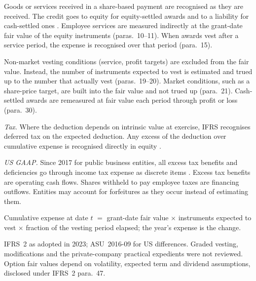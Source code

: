 \begin{qfmethod}\label{meth:share-based-compensation-reporting}
 Goods or services received in a share-based payment are recognised as they are received. The credit goes to equity for equity-settled awards and to a liability for cash-settled ones \citep[IFRS~2 para.~7]{eu-2023-1803-ifrs2}. Employee services are measured indirectly at the grant-date fair value of the equity instruments (paras.~10--11). When awards vest after a service period, the expense is recognised over that period (para.~15).

Non-market vesting conditions (service, profit targets) are excluded from the fair value. Instead, the number of instruments expected to vest is estimated and trued up to the number that actually vest (paras.~19--20). Market conditions, such as a share-price target, are built into the fair value and not trued up (para.~21). Cash-settled awards are remeasured at fair value each period through profit or loss (para.~30).

\emph{Tax.} Where the deduction depends on intrinsic value at exercise, IFRS recognises deferred tax on the expected deduction. Any excess of the deduction over cumulative expense is recognised directly in equity \citep[IAS~12 paras.~68A--68C]{eu-2023-1803-ias12}.

\emph{US GAAP.} Since 2017 for public business entities, all excess tax benefits and deficiencies go through income tax expense as discrete items \citep[pp.~1--3]{us-share-payment-2016}. Excess tax benefits are operating cash flows. Shares withheld to pay employee taxes are financing outflows. Entities may account for forfeitures as they occur instead of estimating them.

 Cumulative expense at date $t$ $=$ grant-date fair value $\times$ instruments expected to vest $\times$ fraction of the vesting period elapsed; the year's expense is the change.

 IFRS~2 as adopted in 2023; ASU~2016-09 for US differences. Graded vesting, modifications and the private-company practical expedients were not reviewed. Option fair values depend on volatility, expected term and dividend assumptions, disclosed under IFRS~2 para.~47.


\end{qfmethod}
